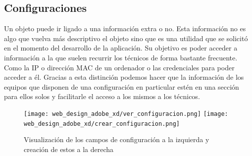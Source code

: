 \subsection{Configuraciones}

Un objeto puede ir ligado a una información extra o no. Esta información no es algo que vuelva más descriptivo el objeto sino que es una utilidad que se solicitó en el momento del desarrollo de la aplicación. Su objetivo es poder acceder a información a la que suelen recurrir los técnicos de forma bastante frecuente. Como la IP o dirección MAC de un ordenador o las credenciales para poder acceder a él. Gracias a esta distinción podemos hacer que la información de los equipos que disponen de una configuración en particular estén en una sección para ellos solos y facilitarle el acceso a los mismos a los técnicos.

\begin{figure}[htbp]
    \centering
    \texttt{[image: web\_design\_adobe\_xd/ver\_configuracion.png]}
    \texttt{[image: web\_design\_adobe\_xd/crear\_configuracion.png]}
    \caption{Visualización de los campos de configuración a la izquierda y creación de estos a la derecha}
\end{figure}